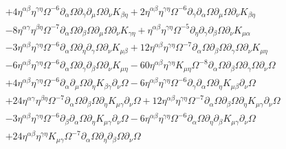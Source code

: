 \documentclass[10pt,letterpaper]{article}
\begin{document}
\begin{align}
& + 4 \eta^{\alpha \beta} \eta^{\gamma \eta} \Omega^{-6} \partial_{\alpha}\Omega \partial_{\gamma}\partial_{\mu}\Omega \partial_{\nu}K_{\beta \eta}
 + 2 \eta^{\alpha \beta} \eta^{\gamma \eta} \Omega^{-6} \partial_{\gamma}\partial_{\alpha}\Omega \partial_{\mu}\Omega \partial_{\nu}K_{\beta \eta}\nonumber\\
& - 8 \eta^{\alpha \gamma} \eta^{\beta \eta} \Omega^{-7} \partial_{\alpha}\Omega \partial_{\beta}\Omega \partial_{\mu}\Omega \partial_{\nu}K_{\gamma \eta}
 + \eta^{\alpha \beta} \eta^{\gamma \eta} \Omega^{-5} \partial_{\eta}\partial_{\gamma}\partial_{\beta}\Omega \partial_{\nu}K_{\mu \alpha}\nonumber\\
& - 3 \eta^{\alpha \beta} \eta^{\gamma \eta} \Omega^{-6} \partial_{\alpha}\Omega \partial_{\eta}\partial_{\gamma}\Omega \partial_{\nu}K_{\mu \beta}
 + 12 \eta^{\alpha \beta} \eta^{\gamma \eta} \Omega^{-7} \partial_{\alpha}\Omega \partial_{\beta}\Omega \partial_{\gamma}\Omega \partial_{\nu}K_{\mu \eta}\nonumber\\
& - 6 \eta^{\alpha \beta} \eta^{\gamma \eta} \Omega^{-6} \partial_{\alpha}\Omega \partial_{\gamma}\partial_{\beta}\Omega \partial_{\nu}K_{\mu \eta}
 - 60 \eta^{\alpha \beta} \eta^{\gamma \eta} K_{\mu \eta} \Omega^{-8} \partial_{\alpha}\Omega \partial_{\beta}\Omega \partial_{\gamma}\Omega \partial_{\nu}\Omega\nonumber\\
& + 4 \eta^{\alpha \beta} \eta^{\gamma \eta} \Omega^{-6} \partial_{\alpha}\partial_{\mu}\Omega \partial_{\eta}K_{\beta \gamma} \partial_{\nu}\Omega
 - 6 \eta^{\alpha \beta} \eta^{\gamma \eta} \Omega^{-6} \partial_{\gamma}\partial_{\alpha}\Omega \partial_{\eta}K_{\mu \beta} \partial_{\nu}\Omega\nonumber\\
& + 24 \eta^{\alpha \gamma} \eta^{\beta \eta} \Omega^{-7} \partial_{\alpha}\Omega \partial_{\beta}\Omega \partial_{\eta}K_{\mu \gamma} \partial_{\nu}\Omega
 + 12 \eta^{\alpha \beta} \eta^{\gamma \eta} \Omega^{-7} \partial_{\alpha}\Omega \partial_{\beta}\Omega \partial_{\eta}K_{\mu \gamma} \partial_{\nu}\Omega\nonumber\\
& - 3 \eta^{\alpha \beta} \eta^{\gamma \eta} \Omega^{-6} \partial_{\beta}\partial_{\alpha}\Omega \partial_{\eta}K_{\mu \gamma} \partial_{\nu}\Omega
 - 6 \eta^{\alpha \beta} \eta^{\gamma \eta} \Omega^{-6} \partial_{\alpha}\Omega \partial_{\eta}\partial_{\beta}K_{\mu \gamma} \partial_{\nu}\Omega\nonumber\\
& + 24 \eta^{\alpha \beta} \eta^{\gamma \eta} K_{\mu \gamma} \Omega^{-7} \partial_{\alpha}\Omega \partial_{\eta}\partial_{\beta}\Omega \partial_{\nu}\Omega

\end{align}
\end{document}
